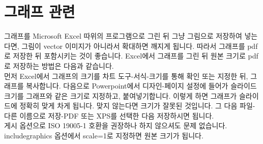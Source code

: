 \documentclass[a4paper,10pt]{article}
\begin{document}
	\section{그래프 관련}
	그래프를 Microsoft Excel 따위의 프로그램으로 그린 뒤
	그냥 그림으로 저장하여 넣는다면, 그림이 vector 이미지가 아니라서
	확대하면 깨지게 됩니다.
	따라서 그래프를 pdf로 저장한 뒤 포함시키는 것이 좋습니다.
	Excel에서 그래프를 그린 뒤 원본 크기로 pdf로 저장하는 방법은
	다음과 같습니다.\\
	먼저 Excel에서 그래프의 크기를 차트 도구-서식-크기를 통해
	확인 또는 지정한 뒤, 그래프를 복사합니다.
	다음으로 Powerpoint에서 디자인-페이지 설정에 들어가 슬라이드 크기를
	그래프와 같은 크기로 지정하고, 붙여넣기합니다.
	이렇게 하면 그래프가 슬라이드에 정확히 맞게 차게 됩니다.
	맞지 않는다면 크기가 잘못된 것입니다.
	그 다음 파일-다른 이름으로 저장-PDF 또는 XPS를 선택한 다음
	저장하시면 됩니다.\\
	게시 옵션으로 ISO 19005-1 호환을 권장하나 하지 않으셔도 문제 없습니다.
	includegraphics 옵션에서 scale=1로 지정하면 원본 크기가 됩니다.
	
\end{document}
